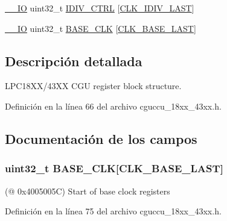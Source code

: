 \begin{DoxyCompactItemize}
\item 
\hyperlink{core__sc300_8h_aec43007d9998a0a0e01faede4133d6be}{\+\_\+\+\_\+\+IO} uint32\+\_\+t \hyperlink{struct_l_p_c___c_g_u___t_a8191ab22b2b6bd96178308187f7c986d}{I\+D\+I\+V\+\_\+\+C\+T\+RL} \mbox{[}\hyperlink{chip__clocks_8h_ad9480404e0134b79428e4c7efdd5869da6bf0e8a9dd6907d1b78038d44421b881}{C\+L\+K\+\_\+\+I\+D\+I\+V\+\_\+\+L\+A\+ST}\mbox{]}
\item 
\hyperlink{core__sc300_8h_aec43007d9998a0a0e01faede4133d6be}{\+\_\+\+\_\+\+IO} uint32\+\_\+t \hyperlink{struct_l_p_c___c_g_u___t_a9639eb025f3268f2962890dbdaabe17e}{B\+A\+S\+E\+\_\+\+C\+LK} \mbox{[}\hyperlink{chip__clocks_8h_a7ffa0364100f6211eb00290d309133d0a4174a4a8b5df9269c2548c2fd1299c2d}{C\+L\+K\+\_\+\+B\+A\+S\+E\+\_\+\+L\+A\+ST}\mbox{]}
\end{DoxyCompactItemize}


\subsection{Descripción detallada}
L\+P\+C18\+X\+X/43\+XX C\+GU register block structure. 

Definición en la línea 66 del archivo cguccu\+\_\+18xx\+\_\+43xx.\+h.



\subsection{Documentación de los campos}
\subsubsection[{\texorpdfstring{B\+A\+S\+E\+\_\+\+C\+LK}{BASE_CLK}}]{ uint32\+\_\+t B\+A\+S\+E\+\_\+\+C\+LK\mbox{[}{\bf C\+L\+K\+\_\+\+B\+A\+S\+E\+\_\+\+L\+A\+ST}\mbox{]}}\hypertarget{struct_l_p_c___c_g_u___t_a9639eb025f3268f2962890dbdaabe17e}{}\label{struct_l_p_c___c_g_u___t_a9639eb025f3268f2962890dbdaabe17e}
(@ 0x4005005C) Start of base clock registers 

Definición en la línea 75 del archivo cguccu\+\_\+18xx\+\_\+43xx.\+h.

